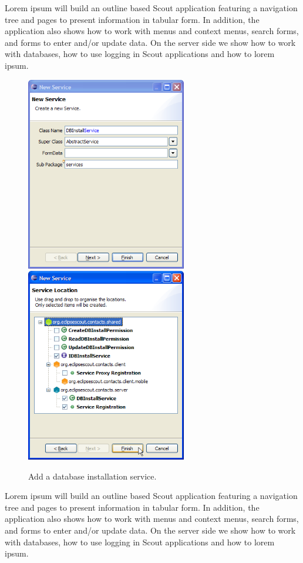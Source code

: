 \documentclass[a4paper,10pt,twoside]{book}
\begin{document}
Lorem ipsum will build an outline based Scout application featuring a navigation tree and pages to present information in tabular form. 
In addition, the application also shows how to work with menus and context menus, search forms, and forms to enter and/or update data. 
On the server side we show how to work with databases, how to use logging in Scout applications and how to lorem ipsum. 

\begin{figure}
\includegraphics[width=7cm]{new_service_dbinstall_1.png} \hspace{5mm}
\includegraphics[width=7cm]{new_service_dbinstall_2.png} 
\caption{Add a database installation service. }
\end{figure}

Lorem ipsum will build an outline based Scout application featuring a navigation tree and pages to present information in tabular form. 
In addition, the application also shows how to work with menus and context menus, search forms, and forms to enter and/or update data. 
On the server side we show how to work with databases, how to use logging in Scout applications and how to lorem ipsum. 
\end{document}
